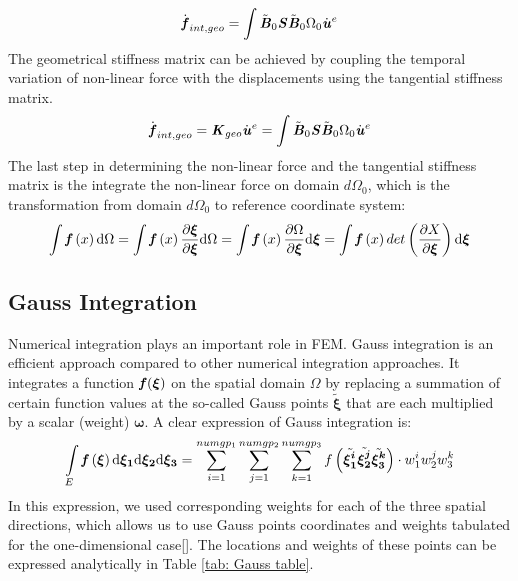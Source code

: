 \begin{equation}
\dot{\textbf{\textit{f}}}_{int,geo} = \int \tilde{\textbf{\textit{B}}}_0 \textbf{\textit{S}} \tilde{\textbf{\textit{B}}}_0 \mathrm{\Omega_0} \dot{\textbf{\textit{u}}}^e
\end{equation}
The geometrical stiffness matrix can be achieved by coupling the temporal variation of non-linear force with the displacements using the tangential stiffness matrix.
\begin{equation}
\dot{\textbf{\textit{f}}}_{int,geo} = \textbf{\textit{K}}_{geo} \dot{\textbf{\textit{u}}}^e =\int \tilde{\textbf{\textit{B}}}_0 \textbf{\textit{S}} \tilde{\textbf{\textit{B}}}_0 \mathrm{\Omega_0} \dot{\textbf{\textit{u}}}^e
\end{equation}
The last step in determining the non-linear force and the tangential stiffness matrix is the integrate the non-linear force on domain $d\Omega_0$, which is the transformation from domain $d\Omega_0$ to reference coordinate system:
\begin{equation}
\int {\textbf{\textit{f}}}\left(x\right) \mathrm{d}\Omega = \int {\textbf{\textit{f}}}\left(x\right) \frac{\partial \boldsymbol{\xi}}{\partial \boldsymbol{\xi}} \mathrm{d}\Omega = \int {\textbf{\textit{f}}}\left(x\right) \frac{\partial \Omega}{\partial \boldsymbol{\xi}} \mathrm{d}\boldsymbol{\xi} = \int {\textbf{\textit{f}}}\left(x\right) det \left(\frac{\partial X}{\partial \boldsymbol{\xi}}\right) \mathrm{d}\boldsymbol{\xi}
\end{equation}


\subsection{Gauss Integration}
Numerical integration plays an important role in FEM. Gauss integration is an efficient approach compared to other numerical integration approaches. It integrates a function $\textbf{\textit{f}}(\boldsymbol{\xi})$ on the spatial domain $\Omega$ by replacing a summation of certain function values at the so-called Gauss points $\tilde{\boldsymbol{\xi}}$ that are each multiplied by a scalar (weight) $\boldsymbol{\omega}$. A clear expression of Gauss integration is:
\begin{equation}
\int \limits_E {\textbf{\textit{f}}} \left(\boldsymbol{\xi}\right) \mathrm{d\boldsymbol{\xi_1}}\mathrm{d\boldsymbol{\xi_2}}\mathrm{d\boldsymbol{\xi_3}} = \displaystyle\sum_{i=1}^{numgp_1}\displaystyle\sum_{j=1}^{numgp_2} \displaystyle\sum_{k=1}^{numgp_3} f\left(\tilde{\boldsymbol{\xi_1^i}}\tilde{\boldsymbol{\xi_2^j}}\tilde{\boldsymbol{\xi_3^k}}\right)\cdot w_1^i w_2^j w_3^k
\end{equation}
In this expression, we used corresponding weights for each of the three spatial directions, which allows us to use Gauss points coordinates and weights tabulated for the one-dimensional case[\cite{FiniteElement}]. The locations and weights of these points can be expressed analytically in Table \ref{tab: Gauss table}.
	
